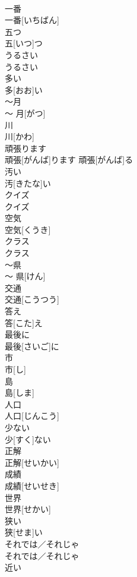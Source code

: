 \documentclass[8pt]{extreport}
\begin{document}
\begin{CJK}{UTF8}{min}
\\	一番	
\\	一番[いちばん]		
\\	五つ	
\\	五[いつ]つ		
\\	うるさい	
\\	うるさい		
\\	多い	
\\	多[おお]い		
\\	〜月	
\\	〜 月[がつ]		
\\	川	
\\	川[かわ]		
\\	頑張ります	
\\	頑張[がんば]ります	頑張[がんば]る	
\\	汚い	
\\	汚[きたな]い		
\\	クイズ	
\\	クイズ		
\\	空気	
\\	空気[くうき]		
\\	クラス	
\\	クラス		
\\	〜県	
\\	〜 県[けん]		
\\	交通	
\\	交通[こうつう]		
\\	答え	
\\	答[こた]え		
\\	最後に	
\\	最後[さいご]に		
\\	市	
\\	市[し]		
\\	島	
\\	島[しま]		
\\	人口	
\\	人口[じんこう]		
\\	少ない	
\\	少[すく]ない		
\\	正解	
\\	正解[せいかい]		
\\	成績	
\\	成績[せいせき]		
\\	世界	
\\	世界[せかい]		
\\	狭い	
\\	狭[せま]い		
\\	それでは／それじゃ	
\\	それでは／それじゃ		
\\	近い	

\end{CJK}
\end{document}
